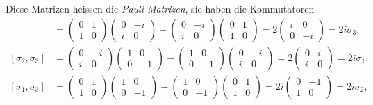 Diese Matrizen heissen die {\em Pauli-Matrizen}, sie haben die Kommutatoren
%
\begin{align*}
[\sigma_1,\sigma_2]
&=
\begin{pmatrix}0&1\\1&0\end{pmatrix}
\begin{pmatrix}0&-i\\i&0\end{pmatrix}
-
\begin{pmatrix}0&-i\\i&0\end{pmatrix}
\begin{pmatrix}0&1\\1&0\end{pmatrix}
=
2\begin{pmatrix}i&0\\0&-i \end{pmatrix}
=
2i\sigma_3,
\\
[\sigma_2,\sigma_3]
&=
\begin{pmatrix}0&-i\\i&0\end{pmatrix}
\begin{pmatrix}1&0\\0&-1\end{pmatrix}
-
\begin{pmatrix}1&0\\0&-1\end{pmatrix}
\begin{pmatrix}0&-i\\i&0\end{pmatrix}
=
2
\begin{pmatrix}0&i\\i&0\end{pmatrix}
=
2i\sigma_1.
\\
[\sigma_1,\sigma_3]
&=
\begin{pmatrix}0&1\\1&0\end{pmatrix}
\begin{pmatrix}1&0\\0&-1\end{pmatrix}
-
\begin{pmatrix}1&0\\0&-1\end{pmatrix}
\begin{pmatrix}0&1\\1&0\end{pmatrix}
=
2i
\begin{pmatrix}0&-1\\1&0\end{pmatrix}
=
2i\sigma_2,
\end{align*}
